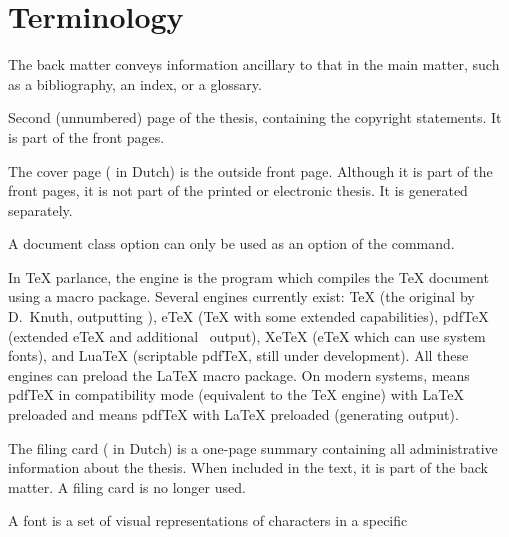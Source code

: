 \newenvironment{termlist}%
 {\renewcommand*\descriptionlabel[1]{\hspace\labelsep
    \normalfont\scshape ##1}%
  \let\olditem\item
  \renewcommand*\item[1][??]{\olditem[##1]\leavevmode\newline\ignorespaces}%
  \newcommand*\latex{\unskip\quad\upshape (LaTeX)}%
  \description}%
 {\enddescription}

\chapter{Terminology}
\label{cha:terminology}
\begin{termlist}
\item[Back matter]
  The back matter conveys information ancillary to that in the main matter,
  such as a bibliography, an index, or a glossary.
\item[Copyright page]
  Second (unnumbered) page of the thesis, containing the copyright
  statements. It is part of the front pages.
\item[Cover page]
  The cover page ( in Dutch) is the outside front page.
  Although it is part of the front pages, it is not part of the printed or
  electronic thesis. It is generated separately.
\item[Document class option \latex]
  A document class option can only be used as an option of the
   command.
\item[Engine \latex]
  In TeX parlance, the engine is the program which compiles the TeX
  document using a macro package. Several engines currently exist: TeX (the
  original by D.\ Knuth, outputting ), eTeX (TeX with some
  extended capabilities), pdfTeX (extended eTeX and additional \PDF\
  output), XeTeX (eTeX which can use system fonts), and \mbox{LuaTeX}
  (scriptable pdfTeX, still under development). All these engines can
  preload the LaTeX macro package. On modern systems, \file{latex} means
  pdfTeX in compatibility mode (equivalent to the TeX engine) with LaTeX
  preloaded and \file{pdflatex} means pdfTeX with LaTeX preloaded
  (generating \file{.pdf} output).
\item[Filing card]
  The filing card ( in Dutch) is a one-page summary containing
  all administrative information about the thesis. When included in the
  text, it is part of the back matter. A filing card is no longer used.
\item[Font]
  A font is a set of visual representations of characters in a specific

\end{termlist}
